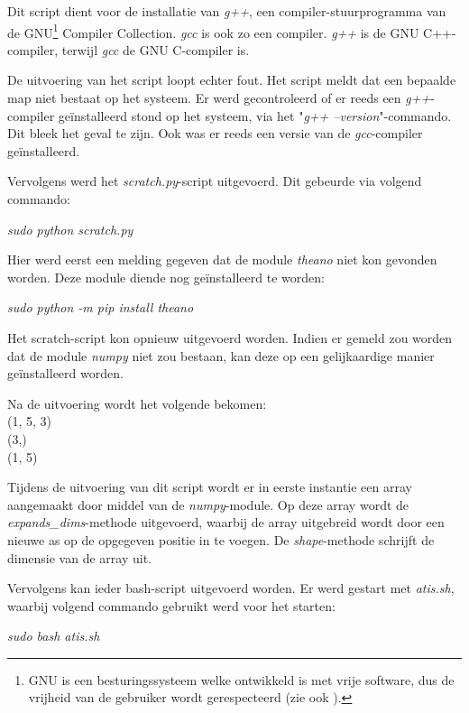 Dit script dient voor de installatie van \textit{g++}, een compiler-stuurprogramma van de GNU\footnote{GNU is een besturingssysteem welke ontwikkeld is met vrije software, dus de vrijheid van de gebruiker wordt gerespecteerd (zie ook \textcite{gnu}).} Compiler Collection. \textit{gcc} is ook zo een compiler. \textit{g++} is de GNU C++-compiler, terwijl \textit{gcc} de GNU C-compiler is.

De uitvoering van het script loopt echter fout. Het script meldt dat een bepaalde map niet bestaat op het systeem. Er werd gecontroleerd of er reeds een \textit{g++}-compiler geïnstalleerd stond op het systeem, via het "\textit{g++ --version}"-commando. Dit bleek het geval te zijn. Ook was er reeds een versie van de \textit{gcc}-compiler geïnstalleerd.

Vervolgens werd het \textit{scratch.py}-script uitgevoerd. Dit gebeurde via volgend commando:

\begin{center}
	\textit{sudo python scratch.py}
\end{center}

Hier werd eerst een melding gegeven dat de module \textit{theano} niet kon gevonden worden. Deze module diende nog geïnstalleerd te worden:

\begin{center}
	\textit{sudo python -m pip install theano}
\end{center}

Het scratch-script kon opnieuw uitgevoerd worden. Indien er gemeld zou worden dat de module \textit{numpy} niet zou bestaan, kan deze op een gelijkaardige manier geïnstalleerd worden.

Na de uitvoering wordt het volgende bekomen: \\
(1, 5, 3) \\
(3,) \\
(1, 5)

Tijdens de uitvoering van dit script wordt er in eerste instantie een array aangemaakt door middel van de \textit{numpy}-module. Op deze array wordt de \textit{expands\_dims}-methode uitgevoerd, waarbij de array uitgebreid wordt door een nieuwe as op de opgegeven positie in te voegen. De \textit{shape}-methode schrijft de dimensie van de array uit. 

Vervolgens kan ieder bash-script uitgevoerd worden. Er werd gestart met \textit{atis.sh}, waarbij volgend commando gebruikt werd voor het starten:

\begin{center}
	\textit{sudo bash atis.sh}
\end{center}

